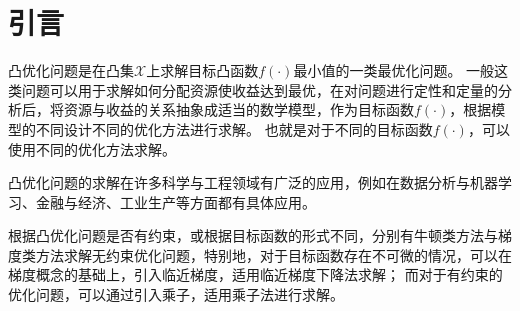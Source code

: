 \section{引言}
凸优化问题是在凸集$\mathcal{X}$上求解目标凸函数$f(\cdot)$最小值的一类最优化问题。
一般这类问题可以用于求解如何分配资源使收益达到最优，在对问题进行定性和定量的分析后，将资源与收益的关系抽象成适当的数学模型，作为目标函数$f(\cdot)$，根据模型的不同设计不同的优化方法进行求解。
也就是对于不同的目标函数$f(\cdot)$，可以使用不同的优化方法求解。

凸优化问题的求解在许多科学与工程领域有广泛的应用，例如在数据分析与机器学习、金融与经济、工业生产等方面都有具体应用。

根据凸优化问题是否有约束，或根据目标函数的形式不同，分别有牛顿类方法与梯度类方法求解无约束优化问题，特别地，对于目标函数存在不可微的情况，可以在梯度概念的基础上，引入临近梯度，适用临近梯度下降法求解；
而对于有约束的优化问题，可以通过引入乘子，适用乘子法进行求解。